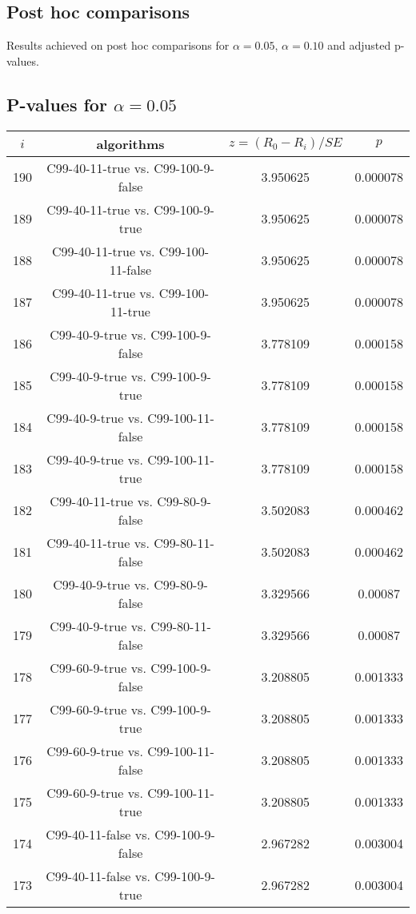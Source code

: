 \documentclass[a4paper,10pt]{article}
\begin{document}
\begin{landscape}
\pagebreak

\section{Post hoc comparisons}

Results achieved on post hoc comparisons for $\alpha = 0.05$, $\alpha = 0.10$ and adjusted p-values.

\subsection{P-values for $\alpha=0.05$}

\begin{table}[!htp]
\centering\scriptsize
\begin{tabular}{cccc}
$i$&algorithms&$z=(R_0 - R_i)/SE$&$p$\\
\hline190&C99-40-11-true vs. C99-100-9-false&3.950625&0.000078\\
189&C99-40-11-true vs. C99-100-9-true&3.950625&0.000078\\
188&C99-40-11-true vs. C99-100-11-false&3.950625&0.000078\\
187&C99-40-11-true vs. C99-100-11-true&3.950625&0.000078\\
186&C99-40-9-true vs. C99-100-9-false&3.778109&0.000158\\
185&C99-40-9-true vs. C99-100-9-true&3.778109&0.000158\\
184&C99-40-9-true vs. C99-100-11-false&3.778109&0.000158\\
183&C99-40-9-true vs. C99-100-11-true&3.778109&0.000158\\
182&C99-40-11-true vs. C99-80-9-false&3.502083&0.000462\\
181&C99-40-11-true vs. C99-80-11-false&3.502083&0.000462\\
180&C99-40-9-true vs. C99-80-9-false&3.329566&0.00087\\
179&C99-40-9-true vs. C99-80-11-false&3.329566&0.00087\\
178&C99-60-9-true vs. C99-100-9-false&3.208805&0.001333\\
177&C99-60-9-true vs. C99-100-9-true&3.208805&0.001333\\
176&C99-60-9-true vs. C99-100-11-false&3.208805&0.001333\\
175&C99-60-9-true vs. C99-100-11-true&3.208805&0.001333\\
174&C99-40-11-false vs. C99-100-9-false&2.967282&0.003004\\
173&C99-40-11-false vs. C99-100-9-true&2.967282&0.003004\\

\end{tabular}
\end{table}
\end{landscape}
\end{document}
